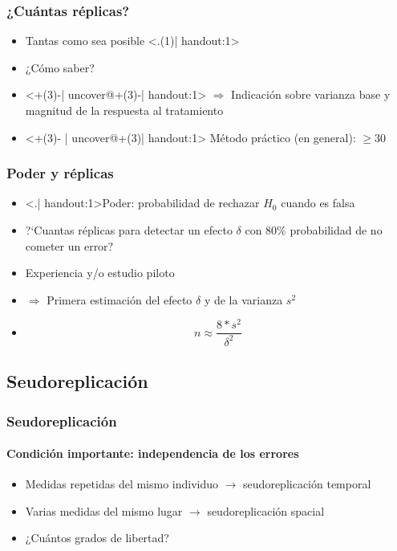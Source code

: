 \documentclass[gray,handout,mathserif]{beamer}
\begin{document}
\begin{frame}[label=manyrep]
   \frametitle{¿Cu\'antas r\'eplicas?}
   \begin{itemize}[<+(1)-| uncover@+(1)-| handout:1>]
      \item Tantas como sea posible \alert<.(1)| handout:1>{\smiley}
      \medskip
      \item<3- | uncover@3-| handout:1> ¿C\'omo saber? 
      \item[ ]<+(3)-| uncover@+(3)-| handout:1> $\Rightarrow$ Indicaci\'on sobre varianza base y magnitud de la respuesta al tratamiento
      \medskip
      \item<+(3)- | uncover@+(3)| handout:1> M\'etodo pr\'actico (en general): $\geq 30 $
   \end{itemize}
\end{frame}%


\begin{frame}[label=power2]
   \frametitle{Poder y r\'eplicas}
   \begin{itemize}[<+-| visible@+-| handout:1>]
      \item \alert<.| handout:1>{Poder: probabilidad de rechazar $H_0$ cuando es falsa}
      \item ?`Cuantas r\'eplicas para detectar un efecto $\delta$ con $80\%$ probabilidad de no cometer un error?
      \item Experiencia y/o estudio piloto
      \item[] $\Rightarrow$ Primera estimaci\'on del efecto $\delta$ y de la varianza $s^2$
      \item $$n\approx \frac{8*s^2}{\delta^2}$$
   \end{itemize}
   \medskip
\end{frame}%


\subsection[Seudoreplicaci\'on]{Seudoreplicaci\'on}

\begin{frame}[label=pseudorep1]
   \frametitle{Seudoreplicaci\'on}
   \framesubtitle{Condici\'on importante: independencia de los errores}
   \begin{itemize}
      \item Medidas repetidas del mismo individuo $\rightarrow$ seudoreplicaci\'on temporal 
      \item Varias medidas del mismo lugar $\rightarrow$ seudoreplicaci\'on spacial 
      \medskip 
      \item ¿Cu\'antos grados de libertad?
   \end{itemize}
\end{frame}%
\end{document}
